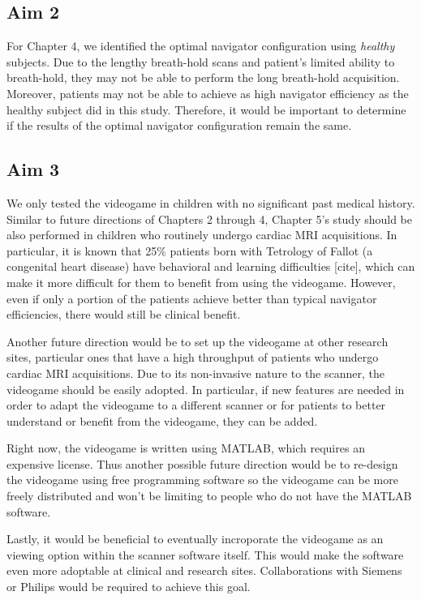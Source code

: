 \subsection{Aim 2}
	For Chapter 4, we identified the optimal navigator configuration using \textit{healthy} subjects. Due to the lengthy breath-hold scans and patient's limited ability to breath-hold, they may not be able to perform the long breath-hold acquisition. Moreover, patients may not be able to achieve as high navigator efficiency as the healthy subject did in this study. Therefore, it would be important to determine if the results of the optimal navigator configuration remain the same.

\subsection{Aim 3}
	We only tested the videogame in children with no significant past medical history. Similar to future directions of Chapters 2 through 4, Chapter 5's study should be also performed in children who routinely undergo cardiac MRI acquisitions. In particular, it is known that 25\% patients born with Tetrology of Fallot (a congenital heart disease) have behavioral and learning difficulties [cite], which can make it more difficult for them to benefit from using the videogame. However, even if only a portion of the patients achieve better than typical navigator efficiencies, there would still be clinical benefit.
	
	Another future direction would be to set up the videogame at other research sites, particular ones that have a high throughput of patients who undergo cardiac MRI acquisitions. Due to its non-invasive nature to the scanner, the videogame should be easily adopted. In particular, if new features are needed in order to adapt the videogame to a different scanner or for patients to better understand or benefit from the videogame, they can be added.
	
	Right now, the videogame is written using MATLAB, which requires an expensive license. Thus another possible future direction would be to re-design the videogame using free programming software so the videogame can be more freely distributed and won't be limiting to people who do not have the MATLAB software. 
	
	Lastly, it would be beneficial to eventually incroporate the videogame as an viewing option within the scanner software itself. This would make the software even more adoptable at clinical and research sites. Collaborations with Siemens or Philips would be required to achieve this goal.
	
	